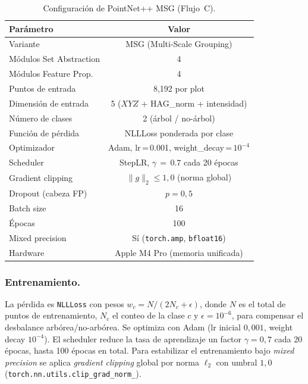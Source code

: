 \documentclass[runningheads]{llncs}
\begin{document}
\begin{table}[t]
\centering
\caption{Configuraci\'on de PointNet++ MSG (Flujo~C).}\label{tab:pointnet}
\begin{tabular}{lc}
\toprule
Par\'ametro & Valor \\
\midrule
Variante                  & MSG (Multi-Scale Grouping) \\
M\'odulos Set Abstraction & 4 \\
M\'odulos Feature Prop.\  & 4 \\
Puntos de entrada         & 8{,}192 por plot \\
Dimensi\'on de entrada    & 5 ($XYZ$ + HAG\_norm + intensidad) \\
N\'umero de clases        & 2 (\'arbol / no-\'arbol) \\
Funci\'on de p\'erdida    & NLLLoss ponderada por clase \\
Optimizador               & Adam, lr\,=\,0.001, weight\_decay\,=\,$10^{-4}$ \\
Scheduler                 & StepLR, $\gamma\,=\,0.7$ cada 20 \'epocas \\
Gradient clipping         & $\lVert g \rVert_2 \leq 1{,}0$ (norma global) \\
Dropout (cabeza FP)       & $p = 0{,}5$ \\
Batch size                & 16 \\
\'Epocas                  & 100 \\
Mixed precision           & S\'i (\texttt{torch.amp}, \texttt{bfloat16}) \\
Hardware                  & Apple M4 Pro (memoria unificada) \\
\bottomrule
\end{tabular}
\end{table}

\subsubsection{Entrenamiento.}
La p\'erdida es \texttt{NLLLoss} con pesos $w_c = N / (2 N_c + \epsilon)$, donde $N$ es el total de puntos de entrenamiento, $N_c$ el conteo de la clase $c$ y $\epsilon = 10^{-6}$, para compensar el desbalance arb\'orea/no-arb\'orea. Se optimiza con Adam (lr inicial $0{,}001$, weight decay $10^{-4}$). El scheduler reduce la tasa de aprendizaje un factor $\gamma = 0{,}7$ cada 20 \'epocas, hasta 100 \'epocas en total. Para estabilizar el entrenamiento bajo \emph{mixed precision} se aplica \emph{gradient clipping} global por norma $\ell_2$ con umbral $1{,}0$ (\texttt{torch.nn.utils.clip\_grad\_norm\_}).
\end{document}
